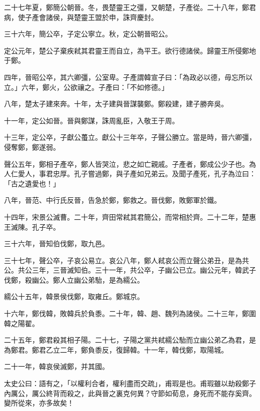 \begin{pinyinscope}
二十七年夏，鄭簡公朝晉。冬，畏楚靈王之彊，又朝楚，子產從。二十八年，鄭君病，使子產會諸侯，與楚靈王盟於申，誅齊慶封。

三十六年，簡公卒，子定公寧立。秋，定公朝晉昭公。

定公元年，楚公子棄疾弒其君靈王而自立，為平王。欲行德諸侯。歸靈王所侵鄭地于鄭。

四年，晉昭公卒，其六卿彊，公室卑。子產謂韓宣子曰：「為政必以德，毋忘所以立。」六年，鄭火，公欲禳之。子產曰：「不如修德。」

八年，楚太子建來奔。十年，太子建與晉謀襲鄭。鄭殺建，建子勝奔吳。

十一年，定公如晉。晉與鄭謀，誅周亂臣，入敬王于周。

十三年，定公卒，子獻公蠆立。獻公十三年卒，子聲公勝立。當是時，晉六卿彊，侵奪鄭，鄭遂弱。

聲公五年，鄭相子產卒，鄭人皆哭泣，悲之如亡親戚。子產者，鄭成公少子也。為人仁愛人，事君忠厚。孔子嘗過鄭，與子產如兄弟云。及聞子產死，孔子為泣曰：「古之遺愛也！」

八年，晉范、中行氏反晉，告急於鄭，鄭救之。晉伐鄭，敗鄭軍於鐵。

十四年，宋景公滅曹。二十年，齊田常弒其君簡公，而常相於齊。二十二年，楚惠王滅陳。孔子卒。

三十六年，晉知伯伐鄭，取九邑。

三十七年，聲公卒，子哀公易立。哀公八年，鄭人弒哀公而立聲公弟丑，是為共公。共公三年，三晉滅知伯。三十一年，共公卒，子幽公已立。幽公元年，韓武子伐鄭，殺幽公。鄭人立幽公弟駘，是為繻公。

繻公十五年，韓景侯伐鄭，取雍丘。鄭城京。

十六年，鄭伐韓，敗韓兵於負黍。二十年，韓、趙、魏列為諸侯。二十三年，鄭圍韓之陽翟。

二十五年，鄭君殺其相子陽。二十七，子陽之黨共弒繻公駘而立幽公弟乙為君，是為鄭君。鄭君乙立二年，鄭負黍反，復歸韓。十一年，韓伐鄭，取陽城。

二十一年，韓哀侯滅鄭，并其國。

太史公曰：語有之，「以權利合者，權利盡而交疏」，甫瑕是也。甫瑕雖以劫殺鄭子內厲公，厲公終背而殺之，此與晉之裏克何異？守節如荀息，身死而不能存奚齊。變所從來，亦多故矣！


\end{pinyinscope}